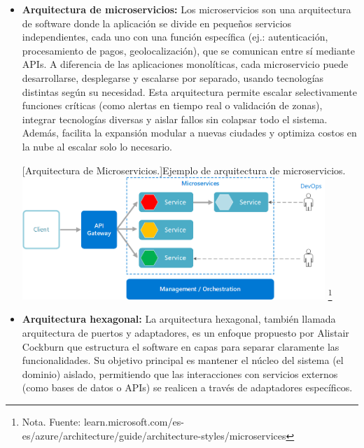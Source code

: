 \begin{itemize}
    \item\textbf{Arquitectura de microservicios: } Los microservicios son una arquitectura de software donde la aplicación se divide en pequeños servicios independientes, cada uno con una función específica (ej.: autenticación, procesamiento de pagos, geolocalización), que se comunican entre sí mediante APIs. A diferencia de las aplicaciones monolíticas, cada microservicio puede desarrollarse, desplegarse y escalarse por separado, usando tecnologías distintas según su necesidad.
        Esta arquitectura permite escalar selectivamente funciones críticas (como alertas en tiempo real o validación de zonas), integrar tecnologías diversas y aislar fallos sin colapsar todo el sistema. Además, facilita la expansión modular a nuevas ciudades y optimiza costos en la nube al escalar solo lo necesario.
        \vspace{2mm}
        \begin{center}
        \begin{minipage}{0.9\textwidth}
            \centering
            [{Arquitectura de Microservicios.}]{Ejemplo de arquitectura de microservicios.}
            \label{microservicios}
            \includegraphics[width=0.9\textwidth]{Content/Images/microservices-logical.png}
            \footnote{Nota. \textup{Fuente: learn.microsoft.com/es-es/azure/architecture/guide/architecture-styles/microservices}}
        \end{minipage}
        \end{center}
    \item \textbf{Arquitectura hexagonal: } La arquitectura hexagonal, también llamada arquitectura de puertos y adaptadores, es un enfoque propuesto por Alistair Cockburn que estructura el software en capas para separar claramente las funcionalidades. Su objetivo principal es mantener el núcleo del sistema (el dominio) aislado, permitiendo que las interacciones con servicios externos (como bases de datos o APIs) se realicen a través de adaptadores específicos.


\end{itemize}
